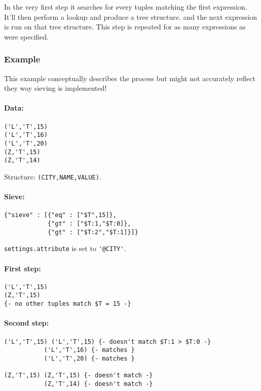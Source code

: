 \documentclass[a4paper]{article}
\begin{document}
In the very first step it searches for every tuples matching the first
expression. It'll then perform a lookup and produce a tree structure.
and the next expression is run on that tree structure. This step is
repeated for as many expressions as were specified.

\subsubsection{Example}

This example conceptually describes the process but might not
accurately reflect they way sieving is implemented!

\paragraph*{Data:} 

\begin{verbatim}
('L','T',15)
('L','T',16)
('L','T',20)
(Z,'T',15)
(Z,'T',14)
\end{verbatim}

Structure: \verb|(CITY,NAME,VALUE)|.

\paragraph*{Sieve:}

\begin{verbatim}
{"sieve" : [{"eq" : ["$T",15]},
            {"gt" : ["$T:1,"$T:0]},
            {"gt" : ["$T:2","$T:1]}]}
\end{verbatim}

\verb|settings.attribute| is set to \verb|'@CITY'|.

\paragraph*{First step:}

\begin{verbatim}
('L','T',15)
(Z,'T',15)
{- no other tuples match $T = 15 -}
\end{verbatim}

\paragraph*{Second step:}

\begin{verbatim}
('L','T',15) ('L','T',15) {- doesn't match $T:1 > $T:0 -}
           ('L','T',16) {- matches }
           ('L','T',20) {- matches }

(Z,'T',15) (Z,'T',15) {- doesn't match -}
           (Z,'T',14) {- doesn't match -}
\end{verbatim}
\end{document}
